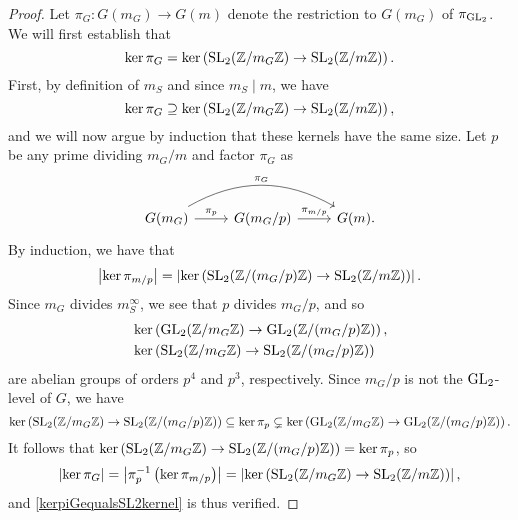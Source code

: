 \begin{proof}
Let $\pi_G : G(m_G) \longrightarrow G(m)$ denote the restriction to $G(m_G)$ of $\pi_{\operatorname{GL}_2}$.  We will first establish that
\begin{equation} \label{kerpiGequalsSL2kernel}
\ker \pi_G = \ker \left( \operatorname{SL}_2(\mathbb{Z}/m_G\mathbb{Z}) \rightarrow \operatorname{SL}_2(\mathbb{Z}/m\mathbb{Z}) \right).
\end{equation}
First, by definition of $m_S$ and since $m_S \mid m$, we have
\[
\ker \pi_G \supseteq \ker \left(  \operatorname{SL}_2(\mathbb{Z}/m_G\mathbb{Z}) \rightarrow \operatorname{SL}_2(\mathbb{Z}/m\mathbb{Z}) \right),
\]
and we will now argue by induction that these kernels have the same size.  Let $p$ be any prime dividing $m_G/m$ and factor $\pi_G$ as
\[
\begin{tikzcd}
G(m_G) \rar{\pi_p} \arrow[black, bend left]{rr}{\pi_G} & G(m_G/p) \rar{\pi_{m/p}} & G(m).
\end{tikzcd}
\]
By induction, we have that
\[
\left| \ker \pi_{m/p} \right| = \left| \ker \left(  \operatorname{SL}_2(\mathbb{Z}/(m_G/p)\mathbb{Z}) \rightarrow \operatorname{SL}_2(\mathbb{Z}/m\mathbb{Z}) \right) \right|.
\]
Since $m_G$ divides $m_S^\infty$, we see that $p$ divides $m_G/p$, and so
\[
\begin{split}
&\ker \left( \operatorname{GL}_2(\mathbb{Z}/m_G\mathbb{Z}) \rightarrow \operatorname{GL}_2(\mathbb{Z}/(m_G/p)\mathbb{Z}) \right), \\
&\ker \left( \operatorname{SL}_2(\mathbb{Z}/m_G\mathbb{Z}) \rightarrow \operatorname{SL}_2(\mathbb{Z}/(m_G/p)\mathbb{Z}) \right)
\end{split}
\]
are abelian groups of orders $p^4$ and $p^3$, respectively.  Since $m_G/p$ is not the $\operatorname{GL}_2$-level of $G$, we have
\[
\ker \left( \operatorname{SL}_2(\mathbb{Z}/m_G\mathbb{Z}) \rightarrow \operatorname{SL}_2(\mathbb{Z}/(m_G/p)\mathbb{Z}) \right) \subseteq \ker \pi_p \subsetneq \ker \left( \operatorname{GL}_2(\mathbb{Z}/m_G\mathbb{Z}) \rightarrow \operatorname{GL}_2(\mathbb{Z}/(m_G/p)\mathbb{Z}) \right).
\]
It follows that $\ker \left( \operatorname{SL}_2(\mathbb{Z}/m_G\mathbb{Z}) \rightarrow \operatorname{SL}_2(\mathbb{Z}/(m_G/p)\mathbb{Z}) \right) = \ker \pi_p$, so 
\[
\left| \ker \pi_G \right| = \left| \pi_p^{-1} \left( \ker \pi_{m/p} \right) \right| = \left| \ker \left( \operatorname{SL}_2(\mathbb{Z}/m_G\mathbb{Z}) \rightarrow \operatorname{SL}_2(\mathbb{Z}/m\mathbb{Z}) \right) \right|, 
\]
and \eqref{kerpiGequalsSL2kernel} is thus verified.


\end{proof}
